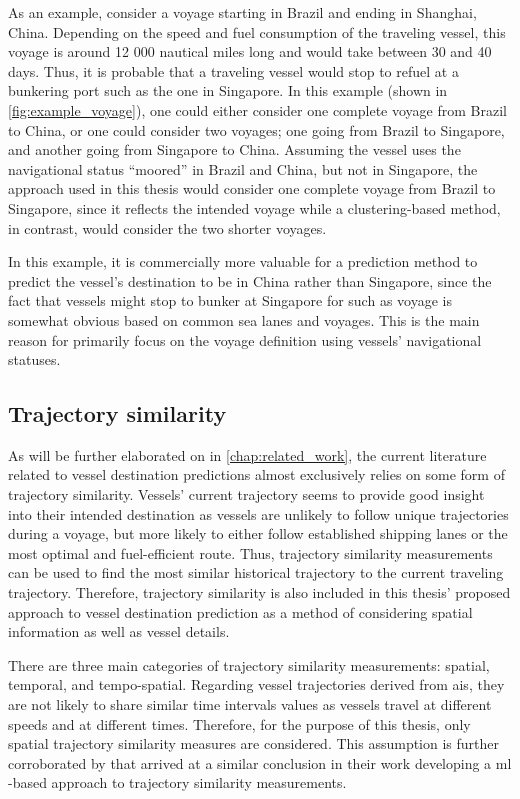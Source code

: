 As an example, consider a voyage starting in Brazil and ending in Shanghai, China. Depending on the speed and fuel consumption of the traveling vessel, this voyage is around 12 000 nautical miles long and would take between 30 and 40 days. Thus, it is probable that a traveling vessel would stop to refuel at a bunkering port such as the one in Singapore. In this example (shown in \cref{fig:example_voyage}), one could either consider one complete voyage from Brazil to China, or one could consider two voyages; one going from Brazil to Singapore, and another going from Singapore to China. Assuming the vessel uses the navigational status ``moored'' in Brazil and China, but not in Singapore, the approach used in this thesis would consider one complete voyage from Brazil to Singapore, since it reflects the intended voyage while a clustering-based method, in contrast, would consider the two shorter voyages.

In this example, it is commercially more valuable for a prediction method to predict the vessel's destination to be in China rather than Singapore, since the fact that vessels might stop to bunker at Singapore for such as voyage is somewhat obvious based on common sea lanes and voyages. This is the main reason for primarily focus on the voyage definition using vessels' navigational statuses.

\subsection{Trajectory similarity}
\label{sec:trajectory_similarity}

As will be further elaborated on in \cref{chap:related_work}, the current literature related to vessel destination predictions almost exclusively relies on some form of trajectory similarity. Vessels' current trajectory seems to provide good insight into their intended destination as vessels are unlikely to follow unique trajectories during a voyage, but more likely to either follow established shipping lanes or the most optimal and fuel-efficient route. Thus, trajectory similarity measurements can be used to find the most similar historical trajectory to the current traveling trajectory. Therefore, trajectory similarity is also included in this thesis' proposed approach to vessel destination prediction as a method of considering spatial information as well as vessel details.

There are three main categories of trajectory similarity measurements: spatial, temporal, and tempo-spatial. Regarding vessel trajectories derived from \acrshort{ais}, they are not likely to share similar time intervals values as vessels travel at different speeds and at different times. Therefore, for the purpose of this thesis, only spatial trajectory similarity measures are considered. This assumption is further corroborated by \cite{Zhang2020AISApproach} that arrived at a similar conclusion in their work developing a \acrfull{ml} -based approach to trajectory similarity measurements.

